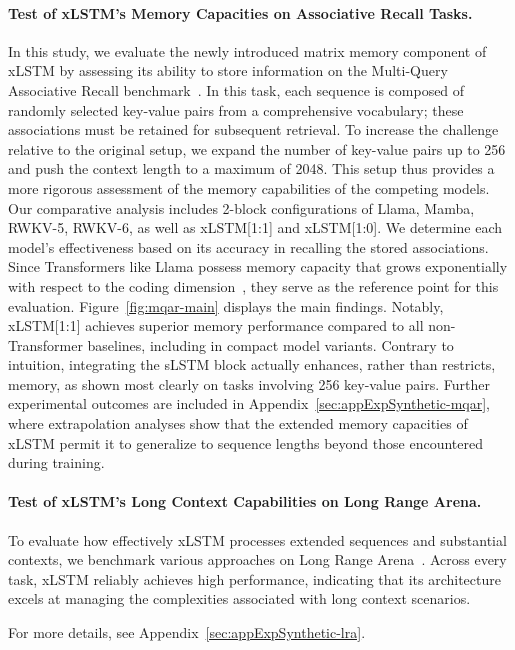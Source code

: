 \paragraph{Test of xLSTM's Memory Capacities on Associative Recall Tasks.} In this study, we evaluate the newly introduced matrix memory component of xLSTM by assessing its ability to store information on the Multi-Query Associative Recall benchmark~\citep{Arora:23arxiv}. In this task, each sequence is composed of randomly selected key-value pairs from a comprehensive vocabulary; these associations must be retained for subsequent retrieval. To increase the challenge relative to the original setup, we expand the number of key-value pairs up to 256 and push the context length to a maximum of 2048. This setup thus provides a more rigorous assessment of the memory capabilities of the competing models. Our comparative analysis includes 2-block configurations of Llama, Mamba, RWKV-5, RWKV-6, as well as xLSTM[1:1] and xLSTM[1:0]. We determine each model's effectiveness based on its accuracy in recalling the stored associations. Since Transformers like Llama possess memory capacity that grows exponentially with respect to the coding dimension~\citep{Ramsauer:21}, they serve as the reference point for this evaluation. Figure~\ref{fig:mqar-main} displays the main findings. Notably, xLSTM[1:1] achieves superior memory performance compared to all non-Transformer baselines, including in compact model variants. Contrary to intuition, integrating the sLSTM block actually enhances, rather than restricts, memory, as shown most clearly on tasks involving 256 key-value pairs. Further experimental outcomes are included in Appendix~\ref{sec:appExpSynthetic-mqar}, where extrapolation analyses show that the extended memory capacities of xLSTM permit it to generalize to sequence lengths beyond those encountered during training.

\paragraph{Test of xLSTM's Long Context Capabilities on Long Range Arena.} To evaluate how effectively xLSTM processes extended sequences and substantial contexts, we benchmark various approaches on Long Range Arena~\citep{Tay:21}. Across every task, xLSTM reliably achieves high performance, indicating that its architecture excels at managing the complexities associated with long context scenarios.

For more details, see Appendix~\ref{sec:appExpSynthetic-lra}.

